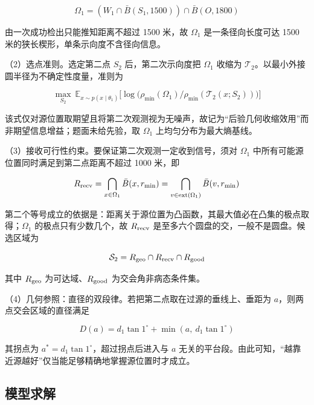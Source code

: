\documentclass[12pt,a4paper]{ctexart}
\begin{document}
\begin{equation}
	\Omega_1=(W_1\cap\bar B(S_1,1500))\cap\bar B(O,1800)
	\label{eq:omega1}
\end{equation}

由一次成功检出只能推知距离不超过 1500 米，故 $\Omega_1$ 是一条径向长度可达 1500 米的狭长楔形，单条示向度不含径向信息。

（2）选点准则。选定第二点 $S_2$ 后，第二次示向度把 $\Omega_1$ 收缩为 $\mathcal T_2$。以最小外接圆半径为不确定性度量，准则为

\begin{equation}
	\max_{S_2}\ \mathbb{E}_{x\sim p(x\mid\theta_1)}\big[\log\big(\rho_{\min}(\Omega_1)/\rho_{\min}(\mathcal T_2(x;S_2))\big)\big]
	\label{eq:utility}
\end{equation}

该式仅对源位置取期望且将第二次观测视为无噪声，故记为“后验几何收缩效用”而非期望信息增益；题面未给先验，取 $\Omega_1$ 上均匀分布为最大熵基线。

（3）接收可行性约束。要保证第二次观测一定收到信号，须对 $\Omega_1$ 中所有可能源位置同时满足到第二点距离不超过 1000 米，即

\begin{equation}
	R_{\rm recv}=\bigcap_{x\in\Omega_1}\bar B(x,r_{\min})=\bigcap_{v\in\operatorname{ext}(\Omega_1)}\bar B(v,r_{\min})
	\label{eq:recv}
\end{equation}

第二个等号成立的依据是：距离关于源位置为凸函数，其最大值必在凸集的极点取得；$\Omega_1$ 的极点只有少数几个，故 $R_{\rm recv}$ 是至多六个圆盘的交，一般不是圆盘。候选区域为

\begin{equation}
	\mathcal S_2=R_{\rm geo}\cap R_{\rm recv}\cap R_{\rm good}
	\label{eq:candidate}
\end{equation}

其中 $R_{\rm geo}$ 为可达域、$R_{\rm good}$ 为交会角非病态条件集。

（4）几何参照：直径的双段律。若把第二点取在过源的垂线上、垂距为 $a$，则两点交会区域的直径满足

\begin{equation}
	D(a)=d_1\tan1^\circ+\min(a,\ d_1\tan1^\circ)
	\label{eq:twoseg}
\end{equation}

其拐点为 $a^{*}=d_1\tan1^\circ$，超过拐点后进入与 $a$ 无关的平台段。由此可知，“越靠近源越好”仅当能足够精确地掌握源位置时才成立。

\subsection{模型求解}
\end{document}

